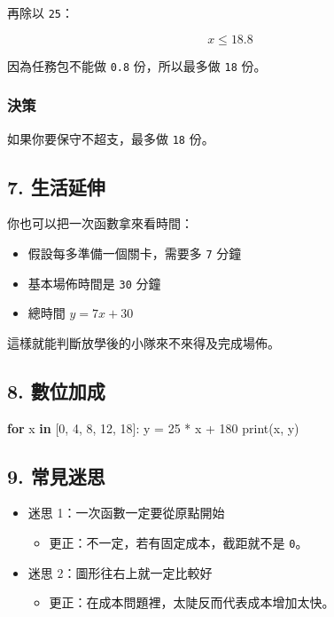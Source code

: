 \documentclass[
  chinese,
  12pt,
  a4paper,
  oneside]{article}
\newenvironment{Shaded}{}{}
\newcommand{\BuiltInTok}[1]{\textcolor[rgb]{0.00,0.50,0.00}{#1}}
\newcommand{\ControlFlowTok}[1]{\textcolor[rgb]{0.00,0.44,0.13}{\textbf{#1}}}
\newcommand{\DecValTok}[1]{\textcolor[rgb]{0.25,0.63,0.44}{#1}}
\newcommand{\KeywordTok}[1]{\textcolor[rgb]{0.00,0.44,0.13}{\textbf{#1}}}
\newcommand{\NormalTok}[1]{#1}
\newcommand{\OperatorTok}[1]{\textcolor[rgb]{0.40,0.40,0.40}{#1}}
\providecommand{\tightlist}{%
  \setlength{\itemsep}{0pt}\setlength{\parskip}{0pt}}
\begin{document}
再除以 \texttt{25}：

\[
x \le 18.8
\]

因為任務包不能做 \texttt{0.8} 份，所以最多做 \texttt{18} 份。

\subsubsection{決策}\label{ux6c7aux7b56-2}

如果你要保守不超支，最多做 \texttt{18} 份。

\subsection{7. 生活延伸}\label{ux751fux6d3bux5ef6ux4f38}

你也可以把一次函數拿來看時間：

\begin{itemize}
\tightlist
\item
  假設每多準備一個關卡，需要多 \texttt{7} 分鐘
\item
  基本場佈時間是 \texttt{30} 分鐘
\item
  總時間 \(y = 7x + 30\)
\end{itemize}

這樣就能判斷放學後的小隊來不來得及完成場佈。

\subsection{8. 數位加成}\label{ux6578ux4f4dux52a0ux6210-1}

\begin{Shaded}
\begin{Highlighting}[]
\ControlFlowTok{for}\NormalTok{ x }\KeywordTok{in}\NormalTok{ [}\DecValTok{0}\NormalTok{, }\DecValTok{4}\NormalTok{, }\DecValTok{8}\NormalTok{, }\DecValTok{12}\NormalTok{, }\DecValTok{18}\NormalTok{]:}
\NormalTok{    y }\OperatorTok{=} \DecValTok{25} \OperatorTok{*}\NormalTok{ x }\OperatorTok{+} \DecValTok{180}
    \BuiltInTok{print}\NormalTok{(x, y)}
\end{Highlighting}
\end{Shaded}

\subsection{9. 常見迷思}\label{ux5e38ux898bux8ff7ux601d-1}

\begin{itemize}
\tightlist
\item
  迷思 1：一次函數一定要從原點開始

  \begin{itemize}
  \tightlist
  \item
    更正：不一定，若有固定成本，截距就不是 \texttt{0}。
  \end{itemize}
\item
  迷思 2：圖形往右上就一定比較好

  \begin{itemize}
  \tightlist
  \item
    更正：在成本問題裡，太陡反而代表成本增加太快。
  \end{itemize}
\end{itemize}
\end{document}
